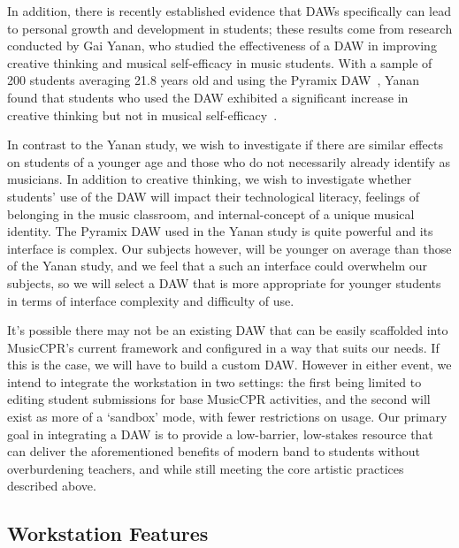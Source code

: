 \documentclass[manuscript,screen,review]{acmart}
\begin{document}
In addition, there is recently established evidence that DAWs specifically can lead to personal growth and development in students; these results come from research conducted by Gai Yanan, who studied the effectiveness of a DAW in improving creative thinking and musical self-efficacy in music students.
With a sample of 200 students averaging 21.8 years old and using the Pyramix DAW~\cite{Pyramix}, Yanan found that students who used the DAW exhibited a significant increase in creative thinking but not in musical self-efficacy~\cite{Yanan24}.

In contrast to the Yanan study, we wish to investigate if there are similar effects on students of a younger age and those who do not necessarily already identify as musicians. 
In addition to creative thinking, we wish to investigate whether students' use of the DAW will impact their technological literacy, feelings of belonging in the music classroom, and internal-concept of a unique musical identity.
The Pyramix DAW used in the Yanan study is quite powerful and its interface is complex.
Our subjects however, will be younger on average than those of the Yanan study, and we feel that a such an interface could overwhelm our subjects, so we will select a DAW that is more appropriate for younger students in terms of interface complexity and difficulty of use.

It's possible there may not be an existing DAW that can be easily scaffolded into MusicCPR's current framework and configured in a way that suits our needs.
If this is the case, we will have to build a custom DAW.
However in either event, we intend to integrate the workstation in two settings: the first being limited to editing student submissions for base MusicCPR activities, and the second will exist as more of a `sandbox' mode, with fewer restrictions on usage.
Our primary goal in integrating a DAW is to provide a low-barrier, low-stakes resource that can deliver the aforementioned benefits of modern band to students without overburdening teachers, and while still meeting the core artistic practices described above.

\renewcommand{\thefootnote}{\fnsymbol{footnote}}
\subsection{Workstation Features}
\end{document}
